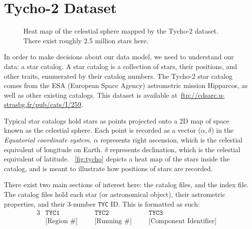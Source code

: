 \section{Tycho-2 Dataset}\label{sec:tycho-2Dataset}
\begin{figure}
    \caption{Heat map of the celestial sphere mapped by the Tycho-2 dataset.
    There exist roughly 2.5 million stars here.}\label{fig:tycho}
\end{figure}

In order to make decisions about our data model, we need to understand our data: a star catalog.
A star catalog is a collection of stars, their positions, and other traits, enumerated by their catalog numbers.
The Tycho-2 star catalog comes from the ESA (European Space Agency) astrometric mission Hipparcos, as well as other
existing catalogs.
This dataset is available at~\url{ftp://cdsarc.u-strasbg.fr/pub/cats/I/259}.

Typical star catalogs hold stars as points projected onto a 2D map of space known as the celestial sphere.
Each point is recorded as a vector ($\alpha, \delta$) in the \textit{Equatorial coordinate system}.
$\alpha$ represents right ascension, which is the celestial equivalent of longitude on Earth.
$\delta$ represents declination, which is the celestial equivalent of latitude.
~\autoref{fig:tycho} depicts a heat map of the stars inside the catalog, and is meant to illustrate how positions of stars are recorded.

There exist two main sections of interest here: the catalog files, and the index file.
The catalog files hold each star (or astronomical object), their astrometric properties, and their 3-number \texttt{TYC}
ID\@.
This is formatted as such:
\begin{alignat*}{3}
    &\texttt{TYC1} &&\texttt{TYC2} &&\texttt{TYC3} \\
    &\text{[Region \#]} \ \ \ \ &&\text{[Running \#]} \ \ \ \ &&\text{[Component Identifier]}
\end{alignat*}

